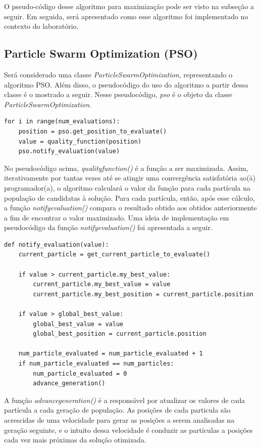 \documentclass[conference]{IEEEtran}
\begin{document}
O pseudo-código desse algoritmo para maximização pode ser visto na subseção a seguir. Em seguida, será apresentado como esse algoritmo foi implementado no contexto do laboratório.

\subsection{Particle Swarm Optimization (PSO)}
Será considerado uma classe \textit{ParticleSwarmOptimization}, representando o algoritmo PSO. Além disso, o pseudocódigo do uso do algoritmo a partir dessa classe é o mostrado a seguir. Nesse pseudocódigo, \textit{pso} é o objeto da classe \textit{ParticleSwarmOptimization}.

\begin{lstlisting}
for i in range(num_evaluations):
	position = pso.get_position_to_evaluate()
	value = quality_function(position)
	pso.notify_evaluation(value)
\end{lstlisting}

No pseudocódigo acima, \textit{quality\underline{\space}function()} é a função a ser maximizada. Assim, iterativamente por tantas vezes até se atingir uma convergência satisfatória ao(à) programador(a), o algoritmo calculará o valor da função para cada partícula na população de candidatas à solução. Para cada partícula, então, após esse cálculo, a função \textit{notify\underline{\space}evaluation()} compara o resultado obtido aos obtidos anteriormente a fim de encontrar o valor maximizado. Uma ideia de implementação em pseudocódigo da função \textit{notify\underline{\space}evaluation()} foi apresentada a seguir.

\begin{lstlisting}
def notify_evaluation(value):
	current_particle = get_current_particle_to_evaluate()

	if value > current_particle.my_best_value:
		current_particle.my_best_value = value
		current_particle.my_best_position = current_particle.position

	if value > global_best_value:
		global_best_value = value
		global_best_position = current_particle.position

	num_particle_evaluated = num_particle_evaluated + 1
	if num_particle_evaluated == num_particles:
		num_particle_evaluated = 0
		advance_generation()
\end{lstlisting}

A função \textit{advance\underline{\space}generation()} é a responsável por atualizar os valores de cada partícula a cada geração de população. As posições de cada particula são acrescidas de uma velocidade para gerar as posições a serem analisadas na geração seguinte, e o intuito dessa velocidade é conduzir as partículas a posições cada vez mais próximas da solução otimizada.
\end{document}

